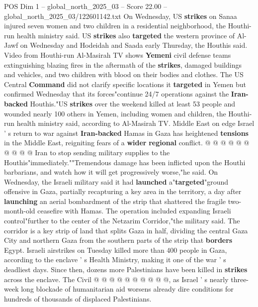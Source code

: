 \begin{textsample}{POS Dim 1 – global\_north\_2025\_03 – Score 22.00 – global\_north\_2025\_03/122601142.txt}
On Wednesday, US \textbf{strikes} on Sanaa injured seven women and two children in a residential neighborhood, the Houthi-run health ministry said.
US \textbf{strikes} also \textbf{targeted} the western province of Al-Jawf on Wednesday and Hodeidah and Saada early Thursday, the Houthis said.
Video from Houthi-run Al-Masirah TV shows \textbf{Yemeni} civil defense teams extinguishing blazing fires in the aftermath of the \textbf{strikes}, damaged buildings and vehicles, and two children with blood on their bodies and clothes.
The US Central \textbf{Command} did not clarify specific locations it \textbf{targeted} in Yemen but confirmed Wednesday that its forces"continue 24/7 operations against the \textbf{Iran-backed} Houthis."US \textbf{strikes} over the weekend killed at least 53 people and wounded nearly 100 others in Yemen, including women and children, the Houthi-run health ministry said, according to Al-Masirah TV.
Middle East on edge Israel ' s return to war against \textbf{Iran-backed} Hamas in Gaza has heightened \textbf{tensions} in the Middle East, reigniting fears of a \textbf{wider} \textbf{regional} conflict. @ @ @ @ @ @ @ @ @ @ Iran to stop sending military supplies to the Houthis"immediately.""Tremendous damage has been inflicted upon the Houthi barbarians, and watch how it will get progressively worse,"he said.
On Wednesday, the Israeli military said it had \textbf{launched} a"\textbf{targeted}"ground offensive in Gaza, partially recapturing a key area in the territory, a day after \textbf{launching} an aerial bombardment of the strip that shattered the fragile two-month-old ceasefire with Hamas.
The operation included expanding Israeli control"further to the center of the Netzarim Corridor,"the military said.
The corridor is a key strip of land that splits Gaza in half, dividing the central Gaza City and northern Gaza from the southern parts of the strip that \textbf{borders} Egypt.
Israeli airstrikes on Tuesday killed more than 400 people in Gaza, according to the enclave ' s Health Ministry, making it one of the war ' s deadliest days.
Since then, dozens more Palestinians have been killed in \textbf{strikes} across the enclave.
The Civil @ @ @ @ @ @ @ @ @ @, as Israel ' s nearly three-week long blockade of humanitarian aid worsens already dire conditions for hundreds of thousands of displaced Palestinians.

\end{textsample}
